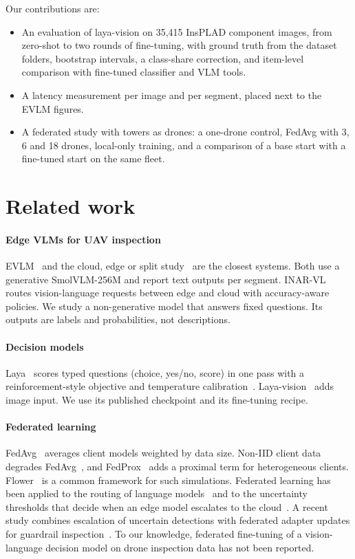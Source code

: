 \documentclass[preprint,12pt]{elsarticle}
\begin{document}
Our contributions are:
\begin{itemize}
\item An evaluation of laya-vision on 35,415 InsPLAD component images, from zero-shot to two rounds of fine-tuning, with ground truth from the dataset folders, bootstrap intervals, a class-share correction, and item-level comparison with fine-tuned classifier and VLM tools.
\item A latency measurement per image and per segment, placed next to the EVLM figures.
\item A federated study with towers as drones: a one-drone control, FedAvg with 3, 6 and 18 drones, local-only training, and a comparison of a base start with a fine-tuned start on the same fleet.
\end{itemize}

\section{Related work}

\paragraph{Edge VLMs for UAV inspection} EVLM~\cite{evlm} and the cloud, edge or split study~\cite{splitvlm} are the closest systems. Both use a generative SmolVLM-256M and report text outputs per segment. INAR-VL~\cite{inarvl} routes vision-language requests between edge and cloud with accuracy-aware policies. We study a non-generative model that answers fixed questions. Its outputs are labels and probabilities, not descriptions.

\paragraph{Decision models} Laya~\cite{laya} scores typed questions (choice, yes/no, score) in one pass with a reinforcement-style objective and temperature calibration~\cite{guo2017}. Laya-vision~\cite{layavision} adds image input. We use its published checkpoint and its fine-tuning recipe.

\paragraph{Federated learning} FedAvg~\cite{fedavg} averages client models weighted by data size. Non-IID client data degrades FedAvg~\cite{zhao2018}, and FedProx~\cite{fedprox} adds a proximal term for heterogeneous clients. Flower~\cite{flower} is a common framework for such simulations. Federated learning has been applied to the routing of language models~\cite{fedrouter} and to the uncertainty thresholds that decide when an edge model escalates to the cloud~\cite{fedhlm}. A recent study combines escalation of uncertain detections with federated adapter updates for guardrail inspection~\cite{guardrail}. To our knowledge, federated fine-tuning of a vision-language decision model on drone inspection data has not been reported.
\end{document}
